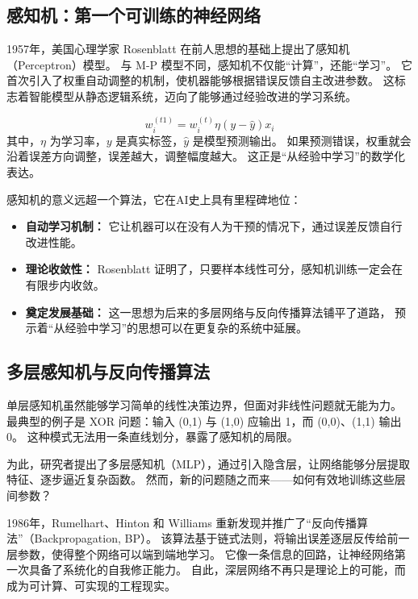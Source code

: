 \subsection{感知机：第一个可训练的神经网络}

1957年，美国心理学家 Rosenblatt 在前人思想的基础上提出了感知机（Perceptron）模型。  
与 M-P 模型不同，感知机不仅能“计算”，还能“学习”。  
它首次引入了权重自动调整的机制，使机器能够根据错误反馈自主改进参数。  
这标志着智能模型从静态逻辑系统，迈向了能够通过经验改进的学习系统。

\begin{equation}
w_{i}^{(t1)} = w_{i}^{(t)}  \eta (y - \hat{y}) x_i
\end{equation}
其中，$\eta$ 为学习率，$y$ 是真实标签，$\hat{y}$ 是模型预测输出。  
如果预测错误，权重就会沿着误差方向调整，误差越大，调整幅度越大。  
这正是“从经验中学习”的数学化表达。

感知机的意义远超一个算法，它在AI史上具有里程碑地位：
\begin{itemize}
\item {\bf 自动学习机制：} 它让机器可以在没有人为干预的情况下，通过误差反馈自行改进性能。
\item {\bf 理论收敛性：} Rosenblatt 证明了，只要样本线性可分，感知机训练一定会在有限步内收敛。
\item {\bf 奠定发展基础：} 这一思想为后来的多层网络与反向传播算法铺平了道路，  
预示着“从经验中学习”的思想可以在更复杂的系统中延展。
\end{itemize}

\subsection{多层感知机与反向传播算法}

单层感知机虽然能够学习简单的线性决策边界，但面对非线性问题就无能为力。  
最典型的例子是 XOR 问题：输入 (0,1) 与 (1,0) 应输出 1，而 (0,0)、(1,1) 输出 0。  
这种模式无法用一条直线划分，暴露了感知机的局限。  

为此，研究者提出了多层感知机（MLP），通过引入隐含层，让网络能够分层提取特征、逐步逼近复杂函数。  
然而，新的问题随之而来——如何有效地训练这些层间参数？  

1986年，Rumelhart、Hinton 和 Williams 重新发现并推广了“反向传播算法”（Backpropagation, BP）。  
该算法基于链式法则，将输出误差逐层反传给前一层参数，使得整个网络可以端到端地学习。  
它像一条信息的回路，让神经网络第一次具备了系统化的自我修正能力。  
自此，深层网络不再只是理论上的可能，而成为可计算、可实现的工程现实。

